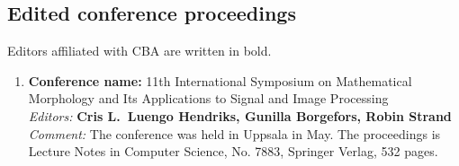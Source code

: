 \subsection{Edited conference proceedings}
Editors affiliated with CBA are written in bold.
{\small

\begin{enumerate}
\item
\textbf{Conference name:} 11th International Symposium on Mathematical Morphology and Its Applications to Signal and Image Processing\\
\emph{Editors:} {\bf Cris L.~Luengo Hendriks, Gunilla Borgefors, Robin Strand}\\
\emph{Comment:} The conference was held in Uppsala in May. The proceedings is Lecture Notes in Computer Science, No. 7883, Springer Verlag, 532 pages.


%
%
\end{enumerate}

}
